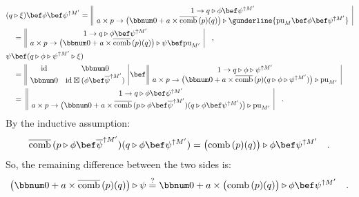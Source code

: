 \begin{align*}
 & (q\triangleright\xi)\bef\phi\bef\psi^{\uparrow M^{\prime}}=\,\begin{array}{||c|}
1\rightarrow q\triangleright\phi\bef\psi^{\uparrow M^{\prime}}\\
a\times p\rightarrow\big(\bbnum 0+a\times\overline{\text{comb}}\,(p)(q)\big)\triangleright\gunderline{\text{pu}_{M}\bef\phi\bef\psi^{\uparrow M^{\prime}}}
\end{array}\\
 & \quad=\,\begin{array}{||c|}
1\rightarrow q\triangleright\phi\bef\psi^{\uparrow M^{\prime}}\\
a\times p\rightarrow\big(\bbnum 0+a\times\overline{\text{comb}}\,(p)(q)\big)\triangleright\psi\bef\text{pu}_{M^{\prime}}
\end{array}\quad,\\
 & \psi\bef(q\triangleright\phi\triangleright\psi^{\uparrow M^{\prime}}\triangleright\xi)\\
 & \quad=\,\begin{array}{||cc|}
\text{id} & \bbnum 0\\
\bbnum 0 & \text{id}\boxtimes(\phi\bef\overline{\psi}^{\uparrow M^{\prime}})
\end{array}\,\bef\,\begin{array}{||c|}
1\rightarrow q\triangleright\phi\triangleright\psi^{\uparrow M^{\prime}}\\
a\times p\rightarrow\big(\bbnum 0+a\times\overline{\text{comb}}\,(p)(q\triangleright\phi\triangleright\psi^{\uparrow M^{\prime}})\big)\triangleright\text{pu}_{M^{\prime}}
\end{array}\\
 & \quad=\,\,\begin{array}{||c|}
1\rightarrow q\triangleright\phi\bef\psi^{\uparrow M^{\prime}}\\
a\times p\rightarrow\big(\bbnum 0+a\times\overline{\text{comb}}\,(p\triangleright\phi\bef\overline{\psi}^{\uparrow M^{\prime}})(q\triangleright\phi\bef\psi^{\uparrow M^{\prime}})\big)\triangleright\text{pu}_{M^{\prime}}
\end{array}\quad.
\end{align*}
By the inductive assumption:
\[
\overline{\text{comb}}\,(p\triangleright\phi\bef\overline{\psi}^{\uparrow M^{\prime}})(q\triangleright\phi\bef\psi^{\uparrow M^{\prime}})=\big(\text{comb}\,(p)(q)\big)\triangleright\phi\bef\psi^{\uparrow M^{\prime}}\quad.
\]
So, the remaining difference between the two sides is:
\[
\big(\bbnum 0+a\times\overline{\text{comb}}\,(p)(q)\big)\triangleright\psi\overset{?}{=}\bbnum 0+a\times\big(\text{comb}\,(p)(q)\big)\triangleright\phi\bef\psi^{\uparrow M^{\prime}}\quad.
\]
